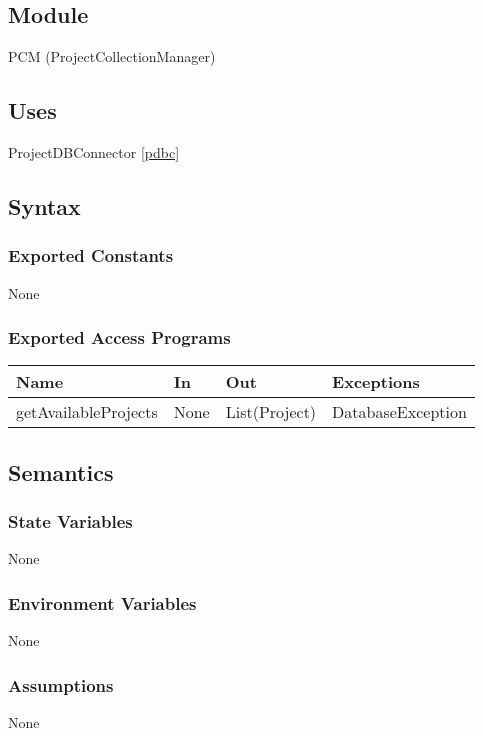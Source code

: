\documentclass[12pt, titlepage]{article}
\begin{document}
    \subsection{Module}
        PCM (ProjectCollectionManager)

    \subsection{Uses}
        ProjectDBConnector \ref{pdbc}

    \subsection{Syntax}
    \subsubsection{Exported Constants}
        None

    \subsubsection{Exported Access Programs}
    \begin{center}\begin{tabular}{p{3cm} p{3cm} p{3cm} p{3cm}}
    \hline\textbf{Name} & \textbf{In} & \textbf{Out} & \textbf{Exceptions} \\
    \hline
        getAvailableProjects & None & List(Project) & DatabaseException \\
    \hline
    \end{tabular}\end{center}

    \subsection{Semantics}
    \subsubsection{State Variables}
        None

    \subsubsection{Environment Variables}
        None

    \subsubsection{Assumptions}
        None
\end{document}
